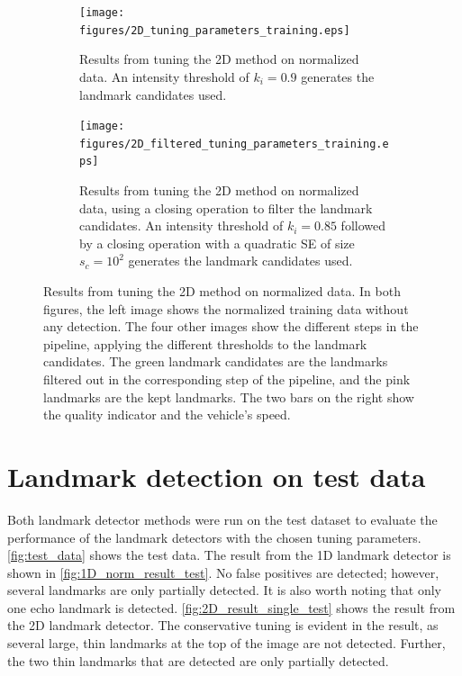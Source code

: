 \begin{figure} %
     \centering
    \begin{subfigure}[t]{0.975\textwidth}
        \centering
        \texttt{[image: figures/2D\_tuning\_parameters\_training.eps]}
        \caption{Results from tuning the 2D method on normalized data. An intensity threshold of $k_i = 0.9$ generates the landmark candidates used.}
        \label{fig:2d_tuning_paramaters_training}
     \end{subfigure}
     \hfill
     \begin{subfigure}[b]{0.975\textwidth}
        \texttt{[image: figures/2D\_filtered\_tuning\_parameters\_training.eps]}
        \caption{Results from tuning the 2D method on normalized data, using a closing operation to filter the landmark candidates. An intensity threshold of $k_i = 0.85$ followed by a closing operation with a quadratic SE of size $s_c = 10^2$ generates the landmark candidates used.}
        \label{fig:2d_tuning_paramaters_w_filtering_training}
     \end{subfigure}
        \caption{Results from tuning the 2D method on normalized data. In both figures, the left image shows the normalized training data without any detection. The four other images show the different steps in the pipeline, applying the different thresholds to the landmark candidates. The green landmark candidates are the landmarks filtered out in the corresponding step of the pipeline, and the pink landmarks are the kept landmarks. The two bars on the right show the quality indicator and the vehicle's speed.}
\end{figure}

\newpage

\section{Landmark detection on test data}

Both landmark detector methods were run on the test dataset to evaluate the performance of the landmark detectors with the chosen tuning parameters. \cref{fig:test_data} shows the test data. The result from the 1D landmark detector is shown in \cref{fig:1D_norm_result_test}. No false positives are detected; however, several landmarks are only partially detected. It is also worth noting that only one echo landmark is detected. \cref{fig:2D_result_single_test} shows the result from the 2D landmark detector. The conservative tuning is evident in the result, as several large, thin landmarks at the top of the image are not detected. Further, the two thin landmarks that are detected are only partially detected. 

